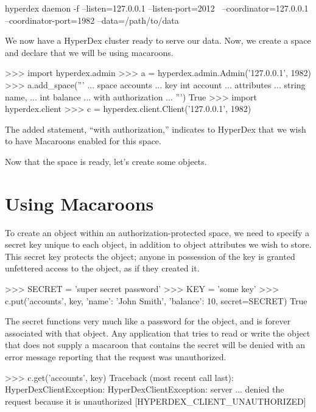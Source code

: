 \begin{consolecode}
hyperdex daemon -f --listen=127.0.0.1 --listen-port=2012 \
                   --coordinator=127.0.0.1 --coordinator-port=1982 --data=/path/to/data
\end{consolecode}

We now have a HyperDex cluster ready to serve our data.  Now, we create a space 
and declare that we will be using macaroons.

\begin{pythoncode}
>>> import hyperdex.admin
>>> a = hyperdex.admin.Admin('127.0.0.1', 1982)
>>> a.add_space('''
... space accounts
... key int account
... attributes
...    string name,
...    int balance
... with authorization
... ''')
True
>>> import hyperdex.client
>>> c = hyperdex.client.Client('127.0.0.1', 1982)
\end{pythoncode}

The added statement, ``with authorization,'' indicates to HyperDex
that we wish to have Macaroons enabled for this space. 

Now that the space is ready, let's create some objects.

\section{Using Macaroons}

To create an object within an authorization-protected space, we need to specify
a secret key unique to each object, in addition to object attributes we wish to
store.  This secret key protects the object; anyone in possession of the key is
granted unfettered access to the object, as if they created it.

\begin{pythoncode}
>>> SECRET = 'super secret password'
>>> KEY = 'some key'
>>> c.put('accounts', key, {'name': 'John Smith', 'balance': 10}, secret=SECRET)
True
\end{pythoncode}

The secret functions very much like a password for the object, and is forever associated with that object.
Any application that tries to read or write the object that does not supply a macaroon that contains the secret 
will be denied with an error message reporting that the request was unauthorized.

\begin{pythoncode}
>>> c.get('accounts', key)
Traceback (most recent call last):
HyperDexClientException: HyperDexClientException: server ... denied the request because it is unauthorized [HYPERDEX_CLIENT_UNAUTHORIZED]
\end{pythoncode}

